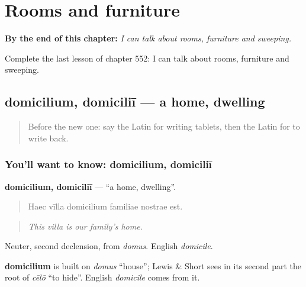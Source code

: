 
\chapter{Rooms and furniture}
\label{ch:la-rooms-and-furniture}

\begin{chapteropening}
\textbf{By the end of this chapter:} \emph{I can talk about rooms, furniture and sweeping.}

Complete the last lesson of chapter 552: I can talk about rooms, furniture and sweeping.
\end{chapteropening}

\section[domicilium, domiciliī]{domicilium, domiciliī — a home, dwelling}

\label{lesson:LA-C552-domicilium}



\begin{quote}
Before the new one: say the Latin for writing tablets, then the Latin for to write back.
\end{quote}

\subsection*{You'll want to know: domicilium, domiciliī}
\textbf{domicilium, domiciliī} — \textquotedblleft{}a home, dwelling\textquotedblright{}.

\begin{quote}
Haec vīlla domicilium familiae nostrae est.
\end{quote}

\begin{quote}
\emph{This villa is our family's home.}
\end{quote}

Neuter, second declension, from \emph{domus}. English \emph{domicile}.

\begin{cousinweb}
\textbf{domicilium} is built on \emph{domus} \textquotedblleft{}house\textquotedblright{}; Lewis \& Short sees in its second part the root of \emph{cēlō} \textquotedblleft{}to hide\textquotedblright{}. English \emph{domicile} comes from it.
\end{cousinweb}

